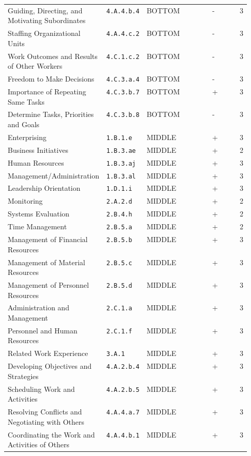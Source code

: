\begin{longtable}[]{@{}p{0.40\linewidth}p{0.15\linewidth}llr@{}}
Guiding, Directing, and Motivating Subordinates & \texttt{4.A.4.b.4} & BOTTOM & - & 3 \\
Staffing Organizational Units & \texttt{4.A.4.c.2} & BOTTOM & - & 3 \\
Work Outcomes and Results of Other Workers & \texttt{4.C.1.c.2} & BOTTOM & - & 3 \\
Freedom to Make Decisions & \texttt{4.C.3.a.4} & BOTTOM & - & 3 \\
Importance of Repeating Same Tasks & \texttt{4.C.3.b.7} & BOTTOM & + & 3 \\
Determine Tasks, Priorities and Goals & \texttt{4.C.3.b.8} & BOTTOM & - & 3 \\
Enterprising & \texttt{1.B.1.e} & MIDDLE & + & 3 \\
Business Initiatives & \texttt{1.B.3.ae} & MIDDLE & + & 2 \\
Human Resources & \texttt{1.B.3.aj} & MIDDLE & + & 3 \\
Management/Administration & \texttt{1.B.3.al} & MIDDLE & + & 3 \\
Leadership Orientation & \texttt{1.D.1.i} & MIDDLE & + & 3 \\
Monitoring & \texttt{2.A.2.d} & MIDDLE & + & 2 \\
Systems Evaluation & \texttt{2.B.4.h} & MIDDLE & + & 2 \\
Time Management & \texttt{2.B.5.a} & MIDDLE & + & 2 \\
Management of Financial Resources & \texttt{2.B.5.b} & MIDDLE & + & 3 \\
Management of Material Resources & \texttt{2.B.5.c} & MIDDLE & + & 3 \\
Management of Personnel Resources & \texttt{2.B.5.d} & MIDDLE & + & 3 \\
Administration and Management & \texttt{2.C.1.a} & MIDDLE & + & 3 \\
Personnel and Human Resources & \texttt{2.C.1.f} & MIDDLE & + & 3 \\
Related Work Experience & \texttt{3.A.1} & MIDDLE & + & 3 \\
Developing Objectives and Strategies & \texttt{4.A.2.b.4} & MIDDLE & + & 3 \\
Scheduling Work and Activities & \texttt{4.A.2.b.5} & MIDDLE & + & 3 \\
Resolving Conflicts and Negotiating with Others & \texttt{4.A.4.a.7} & MIDDLE & + & 3 \\
Coordinating the Work and Activities of Others & \texttt{4.A.4.b.1} & MIDDLE & + & 3 \\

\end{longtable}
